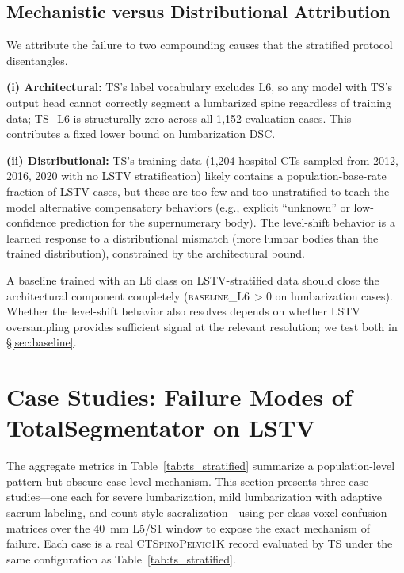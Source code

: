 \documentclass{article}
\newcommand{\dataset}{\textsc{CTSpinoPelvic1K}}
\newcommand{\TS}{TotalSegmentator}
\begin{document}
\subsection{Mechanistic versus Distributional Attribution}

We attribute the failure to two compounding causes that the
stratified protocol disentangles.

\textbf{(i) Architectural:} TS's label vocabulary excludes L6, so
any model with TS's output head cannot correctly segment a
lumbarized spine regardless of training data; \textsc{TS\_L6} is
structurally zero across all 1{,}152 evaluation cases.
This contributes a fixed lower bound on lumbarization DSC.

\textbf{(ii) Distributional:} TS's training data
(1{,}204 hospital CTs sampled from 2012, 2016, 2020 with no LSTV
stratification) likely contains a population-base-rate fraction of
LSTV cases, but these are too few and too unstratified to teach
the model alternative compensatory behaviors (e.g., explicit
``unknown'' or low-confidence prediction for the supernumerary
body).
The level-shift behavior is a learned response to a
distributional mismatch (more lumbar bodies than the trained
distribution), constrained by the architectural bound.

A baseline trained with an L6 class on LSTV-stratified data
should close the architectural component completely
(\textsc{baseline\_L6}\,$>0$ on lumbarization cases).
Whether the level-shift behavior also resolves depends on whether
LSTV oversampling provides sufficient signal at the relevant
resolution; we test both in \S\ref{sec:baseline}.

\section{Case Studies: Failure Modes of \TS{} on LSTV}
\label{sec:case_studies}

The aggregate metrics in Table~\ref{tab:ts_stratified} summarize a
population-level pattern but obscure case-level mechanism.
This section presents three case studies---one each for severe
lumbarization, mild lumbarization with adaptive sacrum
labeling, and count-style sacralization---using per-class voxel
confusion matrices over the 40~mm L5/S1 window to expose the
exact mechanism of failure.
Each case is a real \dataset{} record evaluated by TS under the
same configuration as Table~\ref{tab:ts_stratified}.
\end{document}
